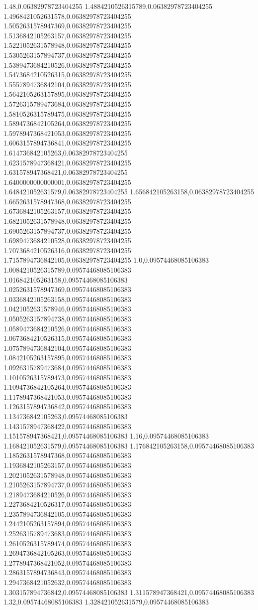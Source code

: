1.48,0.06382978723404255
1.4884210526315789,0.06382978723404255
1.4968421052631578,0.06382978723404255
1.5052631578947369,0.06382978723404255
1.5136842105263157,0.06382978723404255
1.5221052631578948,0.06382978723404255
1.5305263157894737,0.06382978723404255
1.5389473684210526,0.06382978723404255
1.5473684210526315,0.06382978723404255
1.5557894736842104,0.06382978723404255
1.5642105263157895,0.06382978723404255
1.5726315789473684,0.06382978723404255
1.5810526315789475,0.06382978723404255
1.5894736842105264,0.06382978723404255
1.5978947368421053,0.06382978723404255
1.6063157894736841,0.06382978723404255
1.614736842105263,0.06382978723404255
1.6231578947368421,0.06382978723404255
1.631578947368421,0.06382978723404255
1.6400000000000001,0.06382978723404255
1.648421052631579,0.06382978723404255
1.656842105263158,0.06382978723404255
1.6652631578947368,0.06382978723404255
1.6736842105263157,0.06382978723404255
1.6821052631578948,0.06382978723404255
1.6905263157894737,0.06382978723404255
1.6989473684210528,0.06382978723404255
1.7073684210526316,0.06382978723404255
1.7157894736842105,0.06382978723404255
1.0,0.09574468085106383
1.0084210526315789,0.09574468085106383
1.016842105263158,0.09574468085106383
1.0252631578947369,0.09574468085106383
1.0336842105263158,0.09574468085106383
1.0421052631578946,0.09574468085106383
1.0505263157894738,0.09574468085106383
1.0589473684210526,0.09574468085106383
1.0673684210526315,0.09574468085106383
1.0757894736842104,0.09574468085106383
1.0842105263157895,0.09574468085106383
1.0926315789473684,0.09574468085106383
1.1010526315789473,0.09574468085106383
1.1094736842105264,0.09574468085106383
1.1178947368421053,0.09574468085106383
1.1263157894736842,0.09574468085106383
1.134736842105263,0.09574468085106383
1.1431578947368422,0.09574468085106383
1.151578947368421,0.09574468085106383
1.16,0.09574468085106383
1.168421052631579,0.09574468085106383
1.176842105263158,0.09574468085106383
1.1852631578947368,0.09574468085106383
1.1936842105263157,0.09574468085106383
1.2021052631578948,0.09574468085106383
1.2105263157894737,0.09574468085106383
1.2189473684210526,0.09574468085106383
1.2273684210526317,0.09574468085106383
1.2357894736842105,0.09574468085106383
1.2442105263157894,0.09574468085106383
1.2526315789473683,0.09574468085106383
1.2610526315789474,0.09574468085106383
1.2694736842105263,0.09574468085106383
1.2778947368421052,0.09574468085106383
1.2863157894736843,0.09574468085106383
1.2947368421052632,0.09574468085106383
1.303157894736842,0.09574468085106383
1.311578947368421,0.09574468085106383
1.32,0.09574468085106383
1.328421052631579,0.09574468085106383
